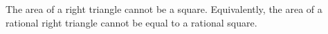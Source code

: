 The area of a right triangle cannot be a square. Equivalently, the area of a rational right triangle cannot be equal to a rational square.
